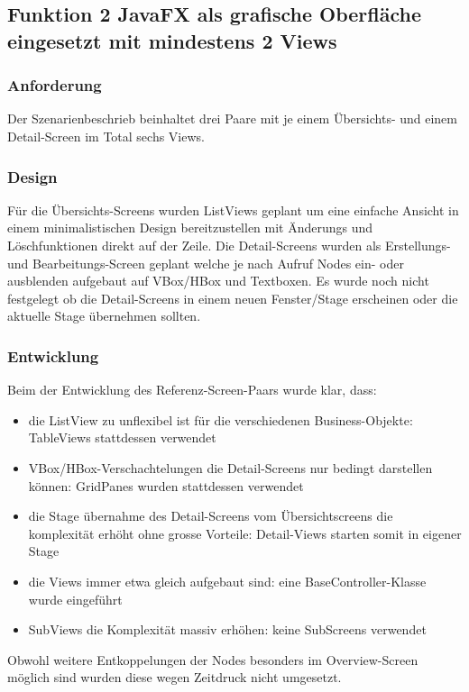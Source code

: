 \subsection[Funktion 2 JavaFX GUI]{Funktion 2 JavaFX als grafische Oberfläche eingesetzt mit mindestens 2 Views}

\subsubsection{Anforderung}

Der Szenarienbeschrieb beinhaltet drei Paare mit je einem Übersichts- und einem Detail-Screen im Total sechs Views.

\subsubsection{Design}

Für die Übersichts-Screens wurden ListViews geplant um eine einfache Ansicht in einem minimalistischen Design bereitzustellen mit Änderungs und Löschfunktionen direkt auf der Zeile.
Die Detail-Screens wurden als Erstellungs- und Bearbeitungs-Screen geplant welche je nach Aufruf Nodes ein- oder ausblenden aufgebaut auf VBox/HBox und Textboxen. Es wurde noch nicht festgelegt ob die Detail-Screens in einem neuen Fenster/Stage erscheinen oder die aktuelle Stage übernehmen sollten.

\subsubsection{Entwicklung}
Beim der Entwicklung des Referenz-Screen-Paars wurde klar, dass:
\begin{itemize}
	\item die ListView zu unflexibel ist für die verschiedenen Business-Objekte: TableViews stattdessen verwendet
	\item VBox/HBox-Verschachtelungen die Detail-Screens nur bedingt darstellen können: GridPanes wurden stattdessen verwendet
	\item die Stage übernahme des Detail-Screens vom Übersichtscreens die komplexität erhöht ohne grosse Vorteile: Detail-Views starten somit in eigener Stage
	\item die Views immer etwa gleich aufgebaut sind: eine BaseController-Klasse wurde eingeführt
	\item SubViews die Komplexität massiv erhöhen: keine SubScreens verwendet
\end{itemize}
Obwohl weitere Entkoppelungen der Nodes besonders im Overview-Screen möglich sind wurden diese wegen Zeitdruck nicht umgesetzt.

